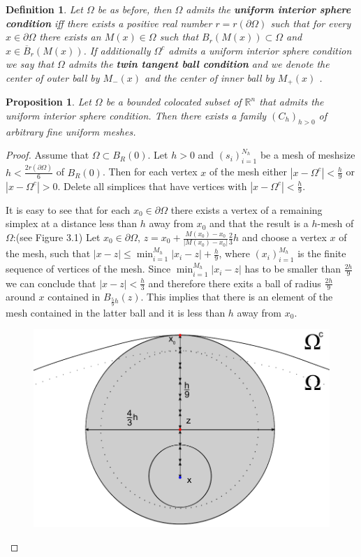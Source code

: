 \documentclass[11pt,a4paper,leqno]{report}
\newtheorem{proposition}{Proposition}[chapter]
\newtheorem{definition}[theorem]{Definition}
\numberwithin{equation}{chapter}
\begin{document}
\begin{definition} Let $\Omega$ be as before, then $\Omega$ admits the\textbf{ uniform interior sphere condition} iff there exists a positive real number $r=r(\partial\Omega)$ such that for every $x\in \partial\Omega$ there exists an $M(x)\in\Omega$ such that $B_r(M(x))\subset\Omega$ and $x\in\overline{B}_r(M(x))$. If additionally $\Omega^c$ admits a uniform interior sphere condition we say that $\Omega$ admits the \textbf{twin tangent ball condition} and we denote the center of outer ball by $M_-(x)$ and the center of inner ball by $M_+(x)$ \cite[p. 109]{Wang}.
\end{definition}
\begin{proposition} Let $\Omega$ be a bounded colocated subset of $\mathbb{R}^n$ that admits the uniform interior sphere condition. Then there exists a family $(C_h)_{h>0}$ of arbitrary fine uniform meshes.
\end{proposition}
\begin{proof}Assume that $\Omega\subset B_R(0)$.
Let $h>0$ and $(s_i)_{i=1}^{N_h}$ be a mesh of meshsize $h<\frac{2r(\partial\Omega)}{6}$ of $B_R(0)$. Then for each vertex $x$ of the mesh either $|x-\Omega^c|<\frac{h}{9}$ or  $|x-\Omega^c|>0$. Delete all simplices that have vertices with $|x-\Omega^c|<\frac{h}{9}$. 

It is easy to see that for each $x_0\in\partial\Omega$ there exists a vertex of a remaining simplex at a distance less than $h$ away from $x_0$ and that the result is a $h$-mesh of $\Omega$:(see Figure 3.1)
Let $x_0\in\partial\Omega$, $z=x_0+\frac{M(x_0)-x_0}{|M(x_0)-x_0|}\frac{2}{3}h$ and choose a vertex $x$ of the mesh, such that $|x-z|\leq \min_{i=1}^{M_h}|x_i-z|+\frac{h}{9}$, where $(x_i)_{i=1}^{M_h}$ is the finite sequence of vertices of the mesh. Since $\min_{i=1}^{M_h}|x_i-z|$ has to be smaller than $\frac{2h}{9}$ we can conclude that $|x-z|<\frac{h}{3}$ and therefore there exits a ball of radius $\frac{2h}{9}$ around $x$ contained in $B_{\frac{5}{9}h}(z)$. This implies that there is an element of the mesh contained in the latter ball and it is less than $h$ away from $x_0$.
\begin{figure}[H]
\begin{center}
\caption{}
	 \includegraphics[height=0.55\textwidth, width=0.55\textheight]{Zeichnung1.pdf}
\end{center}
\end{figure}
\end{proof}
\end{document}
